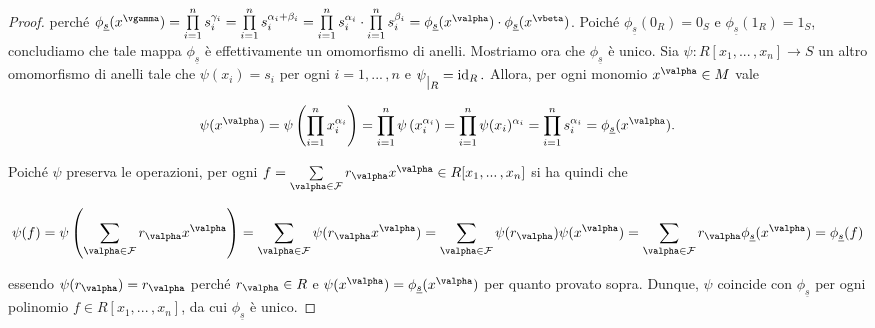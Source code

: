 \begin{proof}
  \noindent perché $\phi_{\underline{s}}(x^{\vgamma})=\prod\limits_{i=1}^n s_i^{\gamma_i}=\prod\limits_{i=1}^n s_i^{\alpha_i+\beta_i}=
  \prod\limits_{i=1}^n s_i^{\alpha_i}\cdot \prod\limits_{i=1}^n s_i^{\beta_i}=\phi_{\underline{s}}(x^{\valpha})\cdot \phi_{\underline{s}}(x^{\vbeta})$.
  Poiché $\phi_{\underline{s}}(0_R)=0_S$ e $ \phi_{\underline{s}}(1_R)=1_S$, concludiamo che tale mappa $\phi_{\underline{s}}$ 
  è effettivamente un omomorfismo di anelli.
  \vspace{2mm}
  \noindent Mostriamo ora che $\phi_{\underline{s}}$ è unico. 
  Sia $\psi\colon R[x_1,...\,,x_n]\to S$ un altro omomorfismo di anelli tale che $\psi(x_i)=s_i$ 
  per ogni $i=1,...\,,n$ e $\psi \raisebox{-.5em}{$\vert_{R}$}= \operatorname{id}_R.$ Allora, 
  per ogni monomio $x^{\valpha}\in M$ vale 
  
  $$\psi(x^{\valpha})=\psi\left(\prod\limits_{i=1}^n x_i^{\alpha_i}\right)=\prod\limits_{i=1}^n 
  \psi\left(x_i^{\alpha_i}\right)=\prod\limits_{i=1}^n \psi(x_i)^{\alpha_i}=\prod\limits_{i=1}^n s_i^{\alpha_i}=
  \phi_{\underline{s}}(x^{\valpha}).$$ 
  
  \noindent Poiché $\psi$ preserva le operazioni, per ogni $f=\sum\limits_{\valpha\in \mathcal{F}} r_{\valpha}x^{\valpha}\in R[x_1,...\,,x_n]$ 
  si ha quindi che 
  
  \[ \psi(f)=\psi\left(\sum\limits_{\valpha\in \mathcal{F}} r_{\valpha}x^{\valpha}\right)=\sum\limits_{\valpha\in \mathcal{F}} 
  \psi(r_{\valpha}x^{\valpha})=\sum\limits_{\valpha\in \mathcal{F}} \psi(r_{\valpha})\psi(x^{\valpha})=
  \sum\limits_{\valpha\in \mathcal{F}} r_{\valpha}\phi_{\underline{s}}(x^{\valpha})=\phi_{\underline{s}}(f)\] 
  
  \noindent essendo $\psi(r_{\valpha})=r_{\valpha}$ perché $r_{\valpha}\in R$ e $\psi(x^{\valpha})=\phi_{\underline{s}}(x^{\valpha})$ 
  per quanto provato sopra. Dunque, $\psi$ coincide con $\phi_{\underline{s}}$ per ogni polinomio $f\in R[x_1,...\,,x_n]$, 
  da cui $\phi_{\underline{s}}$ è unico.
\end{proof}

\clearpage